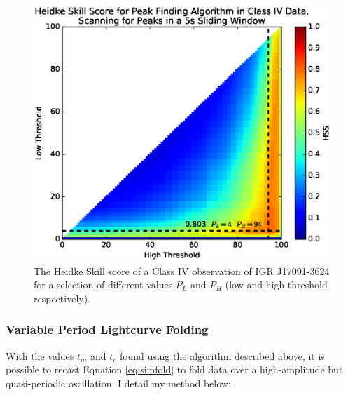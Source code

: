 \begin{figure}
    \includegraphics[width=\columnwidth, trim = 0mm 10mm 0mm 10mm]{images/HSS_J.eps}
    \captionsetup{singlelinecheck=off}
    \caption[The Heidke Skill score of a Class IV observation of IGR J17091-3624 for a selection of different values $P_L$ and $P_H$ (low and high threshold respectively).]{The Heidke Skill score of a Class IV observation of IGR J17091-3624 for a selection of different values $P_L$ and $P_H$ (low and high threshold respectively).}
   \label{fig:Heidke}
\end{figure}

\subsubsection{Variable Period Lightcurve Folding}

\par With the values $t_m$ and $t_c$ found using the algorithm described above, it is possible to recast Equation \ref{eq:simfold} to fold data over a high-amplitude but quasi-periodic oscillation.  I detail my method below:


